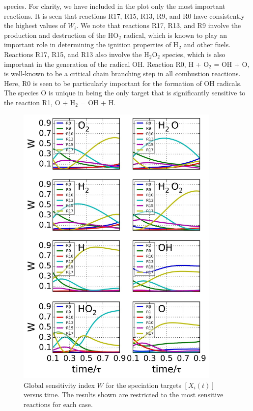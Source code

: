 species. For clarity, we have included in the plot only the most
important reactions. It is seen that reactions R17, R15, R13, R9,
and R0 have consistently the highest values of $W_i$. We note that
reactions R17, R13, and R9 involve the production and
destruction of the HO$_2$ radical, which is known to play an
important role in determining the ignition properties of H$_2$ and
other fuels.\cite{ch3_46_westbrook2000chemical,ch3_47_killingsworth2011increased,ch3_48_keromnes2013experimental} Reactions R17, R15, and R13 also involve the
H$_2$O$_2$ species, which is also important in the generation of the
radical OH.\cite{ch3_49_lee1998hydrogen,ch3_50_zhou2012theoretical} Reaction R0, H + O$_2$ = OH + O, is well-known
to be a critical chain branching step in all combustion reactions.
Here, R0 is seen to be particularly important for the formation
of OH radicals. The species O is unique in being the only target
that is significantly sensitive to the reaction R1, O + H$_2$ = OH +
H.
\begin{figure}[htbp]
	\caption[Global sensitivity index $W$ versus time of H$_2$-O$_2$ combustion system]{Global sensitivity index $W$ for the speciation targets $\left[ X_i(t) \right]$ versus time. The results shown are restricted to the most sensitive reactions for each case.}
    \begin{center}
	\includegraphics[width=100mm]{figs/chapter3/fig4.jpg}
    \end{center}
\label{ch3:fig4}
\end{figure}
\newline

